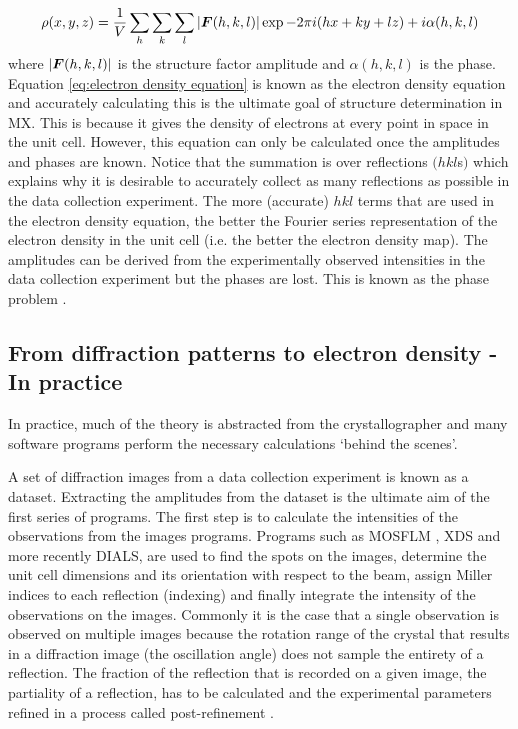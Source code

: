         \begin{equation}
            \rho(x,y,z) = \frac{1}{V} \sum_h \sum_k \sum_l |\boldsymbol{F}(h,k,l)| \exp{-2\pi i (hx + ky + lz) + i \alpha(h,k,l)}
            \label{eq:electron density equation}
        \end{equation}
        where $|\boldsymbol{F}(h,k,l)|$ is the structure factor amplitude and $\alpha(h,k,l)$ is the phase. Equation \ref{eq:electron density equation} is known as the electron density equation and accurately calculating this is the ultimate goal of structure determination in MX.
        This is because it gives the density of electrons at every point in space in the unit cell.
        However, this equation can only be calculated once the amplitudes and phases are known.
        Notice that the summation is over reflections $(hkl$s$)$ which explains why it is desirable to accurately collect as many reflections as possible in the data collection experiment.
        The more (accurate) $hkl$ terms that are used in the electron density equation, the better the Fourier series representation of the electron density in the unit cell (i.e. the better the electron density map).
        The amplitudes can be derived from the experimentally observed intensities in the data collection experiment but the phases are lost. This is known as the phase problem \cite{taylor2010}.

    \subsection{From diffraction patterns to electron density - In practice}
    \label{sub:From diffraction patterns to electron density - In practice}
        In practice, much of the theory is abstracted from the crystallographer and many software programs perform the necessary calculations `behind the scenes'.

        A set of diffraction images from a data collection experiment is known as a dataset. Extracting the amplitudes from the dataset is the ultimate aim of the first series of programs.
        The first step is to calculate the intensities of the observations from the images programs.
        Programs such as MOSFLM \cite{leslie2007}, XDS \cite{kabsch2010} and more recently DIALS, are used to find the spots on the images, determine the unit cell dimensions and its orientation with respect to the beam, assign Miller indices to each reflection (indexing) and finally integrate the intensity of the observations on the images.
        Commonly it is the case that a single observation is observed on multiple images because the rotation range of the crystal that results in a diffraction image (the oscillation angle) does not sample the entirety of a reflection.
        The fraction of the reflection that is recorded on a given image, the partiality of a reflection, has to be calculated and the experimental parameters refined in a process called post-refinement \cite{rossmann1979processing, rossmann1979oscillation}.

